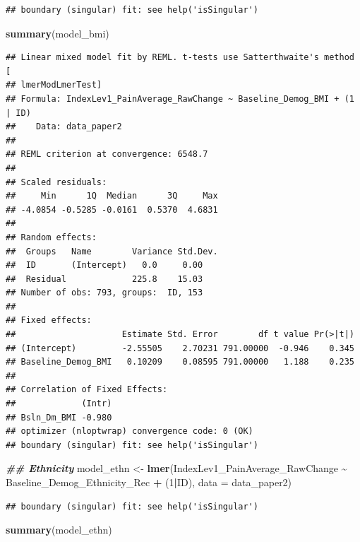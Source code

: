 \documentclass[
  12pt,
]{article}
\newenvironment{Shaded}{\begin{snugshade}}{\end{snugshade}}
\newcommand{\AttributeTok}[1]{\textcolor[rgb]{0.13,0.29,0.53}{#1}}
\newcommand{\DecValTok}[1]{\textcolor[rgb]{0.00,0.00,0.81}{#1}}
\newcommand{\DocumentationTok}[1]{\textcolor[rgb]{0.56,0.35,0.01}{\textbf{\textit{#1}}}}
\newcommand{\FunctionTok}[1]{\textcolor[rgb]{0.13,0.29,0.53}{\textbf{#1}}}
\newcommand{\NormalTok}[1]{#1}
\newcommand{\OtherTok}[1]{\textcolor[rgb]{0.56,0.35,0.01}{#1}}
\newcommand{\SpecialCharTok}[1]{\textcolor[rgb]{0.81,0.36,0.00}{\textbf{#1}}}
\begin{document}
\begin{verbatim}
## boundary (singular) fit: see help('isSingular')
\end{verbatim}

\begin{Shaded}
\begin{Highlighting}[]
\FunctionTok{summary}\NormalTok{(model\_bmi)}
\end{Highlighting}
\end{Shaded}

\begin{verbatim}
## Linear mixed model fit by REML. t-tests use Satterthwaite's method [
## lmerModLmerTest]
## Formula: IndexLev1_PainAverage_RawChange ~ Baseline_Demog_BMI + (1 | ID)
##    Data: data_paper2
## 
## REML criterion at convergence: 6548.7
## 
## Scaled residuals: 
##     Min      1Q  Median      3Q     Max 
## -4.0854 -0.5285 -0.0161  0.5370  4.6831 
## 
## Random effects:
##  Groups   Name        Variance Std.Dev.
##  ID       (Intercept)   0.0     0.00   
##  Residual             225.8    15.03   
## Number of obs: 793, groups:  ID, 153
## 
## Fixed effects:
##                     Estimate Std. Error        df t value Pr(>|t|)
## (Intercept)         -2.55505    2.70231 791.00000  -0.946    0.345
## Baseline_Demog_BMI   0.10209    0.08595 791.00000   1.188    0.235
## 
## Correlation of Fixed Effects:
##             (Intr)
## Bsln_Dm_BMI -0.980
## optimizer (nloptwrap) convergence code: 0 (OK)
## boundary (singular) fit: see help('isSingular')
\end{verbatim}

\begin{Shaded}
\begin{Highlighting}[]
\DocumentationTok{\#\# Ethnicity}
\NormalTok{model\_ethn }\OtherTok{\textless{}{-}} \FunctionTok{lmer}\NormalTok{(IndexLev1\_PainAverage\_RawChange }\SpecialCharTok{\textasciitilde{}}\NormalTok{ Baseline\_Demog\_Ethnicity\_Rec }\SpecialCharTok{+}\NormalTok{ (}\DecValTok{1}\SpecialCharTok{|}\NormalTok{ID), }\AttributeTok{data =}\NormalTok{ data\_paper2)}
\end{Highlighting}
\end{Shaded}

\begin{verbatim}
## boundary (singular) fit: see help('isSingular')
\end{verbatim}

\begin{Shaded}
\begin{Highlighting}[]
\FunctionTok{summary}\NormalTok{(model\_ethn)}
\end{Highlighting}
\end{Shaded}
\end{document}
